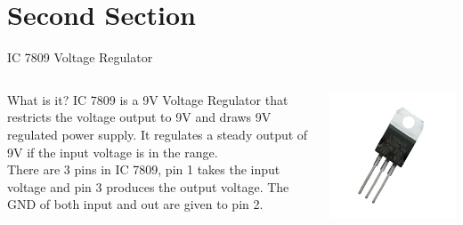 \documentclass{beamer}
\begin{document}
\section*{Second Section}
\begin{frame}{IC 7809 Voltage Regulator}
 \begin{columns}
 \begin{column}{0.4\textwidth}
  \begin{block}{What is it?}
 IC 7809 is a 9V Voltage Regulator that restricts the voltage output to 9V and draws 9V regulated power supply. It regulates a steady output of 9V if the input voltage is in the range. \\
  There are 3 pins in IC 7809, pin 1 takes the input voltage and pin 3 produces the output voltage. The GND of both input and out are given to pin 2.
  \end{block}
  \end{column}
  
  \begin{column}{0.4\textwidth}
  \includegraphics[width=\columnwidth]{IC.jpg}
  \end{column}
  
  \end{columns}
\end{frame}
\end{document}
